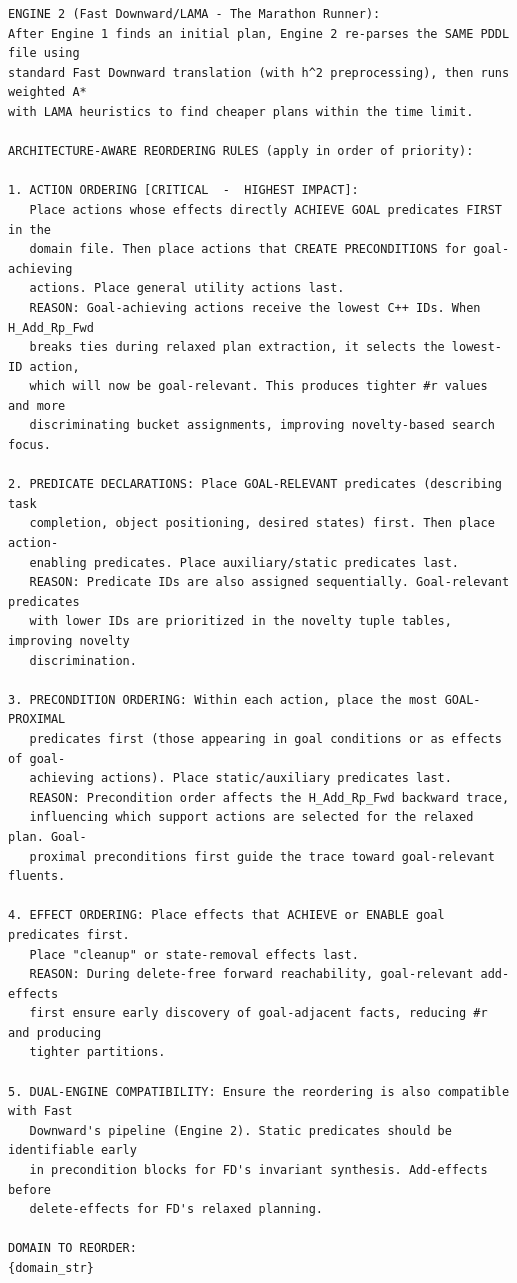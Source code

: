 \documentclass[
  numbers=noenddot,
  english,  %
  a4paper,  %
  oneside,  %
  bibliography=totoc,
  headsepline,
  cleardoublepage=empty,
  parskip=half,
  draft=false
]{scrbook}
\theoremstyle{break}
\begin{document}
\begin{lstlisting}[language={}, caption={Architecture-aware prompt for \gls{bfws}-Preference.}, label={lst:prompt:bfws}, basicstyle=\small\ttfamily, numbers=none, frame=single, breaklines=true]
ENGINE 2 (Fast Downward/LAMA - The Marathon Runner):
After Engine 1 finds an initial plan, Engine 2 re-parses the SAME PDDL file using
standard Fast Downward translation (with h^2 preprocessing), then runs weighted A*
with LAMA heuristics to find cheaper plans within the time limit.

ARCHITECTURE-AWARE REORDERING RULES (apply in order of priority):

1. ACTION ORDERING [CRITICAL  -  HIGHEST IMPACT]:
   Place actions whose effects directly ACHIEVE GOAL predicates FIRST in the
   domain file. Then place actions that CREATE PRECONDITIONS for goal-achieving
   actions. Place general utility actions last.
   REASON: Goal-achieving actions receive the lowest C++ IDs. When H_Add_Rp_Fwd
   breaks ties during relaxed plan extraction, it selects the lowest-ID action,
   which will now be goal-relevant. This produces tighter #r values and more
   discriminating bucket assignments, improving novelty-based search focus.

2. PREDICATE DECLARATIONS: Place GOAL-RELEVANT predicates (describing task
   completion, object positioning, desired states) first. Then place action-
   enabling predicates. Place auxiliary/static predicates last.
   REASON: Predicate IDs are also assigned sequentially. Goal-relevant predicates
   with lower IDs are prioritized in the novelty tuple tables, improving novelty
   discrimination.

3. PRECONDITION ORDERING: Within each action, place the most GOAL-PROXIMAL
   predicates first (those appearing in goal conditions or as effects of goal-
   achieving actions). Place static/auxiliary predicates last.
   REASON: Precondition order affects the H_Add_Rp_Fwd backward trace,
   influencing which support actions are selected for the relaxed plan. Goal-
   proximal preconditions first guide the trace toward goal-relevant fluents.

4. EFFECT ORDERING: Place effects that ACHIEVE or ENABLE goal predicates first.
   Place "cleanup" or state-removal effects last.
   REASON: During delete-free forward reachability, goal-relevant add-effects
   first ensure early discovery of goal-adjacent facts, reducing #r and producing
   tighter partitions.

5. DUAL-ENGINE COMPATIBILITY: Ensure the reordering is also compatible with Fast
   Downward's pipeline (Engine 2). Static predicates should be identifiable early
   in precondition blocks for FD's invariant synthesis. Add-effects before
   delete-effects for FD's relaxed planning.

DOMAIN TO REORDER:
{domain_str}
\end{lstlisting}
\end{document}
